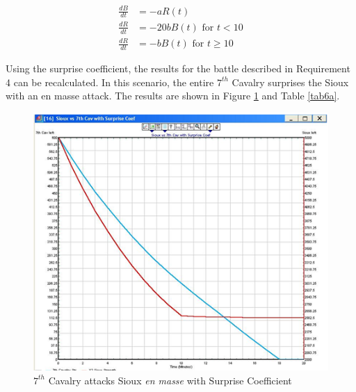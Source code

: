\documentclass[letterpaper,10pt]{article}
\begin{document}
\begin{align*}
\frac{dB}{dt} &= -aR(t) \\
\frac{dR}{dt} &= -20bB(t) \mbox{\ for\ } t < 10 \\
\frac{dR}{dt} &= -bB(t) \mbox{\ for\ } t \geq 10
\end{align*}

Using the surprise coefficient, the results for the battle described in Requirement 4 can be recalculated.  In this scenario, the entire $7^{th}$ Cavalry surprises the Sioux with an en masse attack.  The results are shown in Figure \ref{fig6a} and Table \ref{tab6a}.
\begin{figure}[h!tp]
\begin{center}
\includegraphics[scale=0.4]{fig6a.png}
\caption{$7^{th}$ Cavalry attacks Sioux \emph{en masse} with Surprise Coefficient}
\label{fig6a}
\end{center}
\end{figure}
\end{document}
